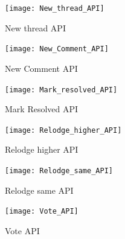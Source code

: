 \documentclass{article}
\begin{document}
        \begin{figure}[h]
            \centering
            \texttt{[image: New\_thread\_API]}
            \caption{New thread API}
            \label{fig:my_label}
        \end{figure}
        \begin{figure}[h]
            \centering
            \texttt{[image: New\_Comment\_API]}
            \caption{New Comment API}
            \label{fig:my_label}
        \end{figure}
        \begin{figure}[h]
            \centering
            \texttt{[image: Mark\_resolved\_API]}
            \caption{Mark Resolved API}
            \label{fig:my_label}
        \end{figure}
        \begin{figure}[h]
            \centering
            \texttt{[image: Relodge\_higher\_API]}
            \caption{Relodge higher API}
            \label{fig:my_label}
        \end{figure}
        \begin{figure}[h]
            \centering
            \texttt{[image: Relodge\_same\_API]}
            \caption{Relodge same API}
            \label{fig:my_label}
        \end{figure}
        \begin{figure}[h]
            \centering
            \texttt{[image: Vote\_API]}
            \caption{Vote API}
            \label{fig:my_label}
        \end{figure}
      
\clearpage
\end{document}
